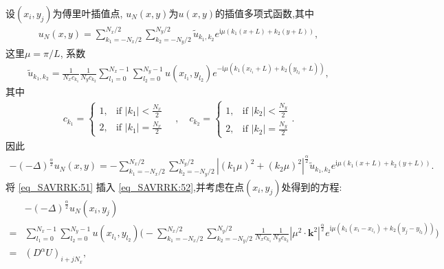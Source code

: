 设$\left(x_{i}, y_{j}\right)$为傅里叶插值点, $u_{N}(x, y)$为$u(x, y)$的插值多项式函数,其中
\begin{align}\label{eq_SAVRRK:50}
u_{N}(x, y)=\sum_{k_{1}=-N_{x} / 2}^{N_{x} / 2} \sum_{k_{2}=-N_{y} / 2}^{N_{y} / 2} \tilde{u}_{k_{1}, k_{2}} e^{\mathrm{i}\mu\left( k_{1} (x+L)+k_{2}(y+L)\right)},
\end{align}
这里$\mu={\pi}/{L}$, 系数
\begin{align}\label{eq_SAVRRK:51}
\tilde{u}_{k_{1}, k_{2}}=\frac{1}{N_{x} c_{k_{1}}} \frac{1}{N_{y} c_{k_{2}}} \sum_{l_1=0}^{N_{x}-1} \sum_{l_2=0}^{N_{y}-1} u(x_{l_1}, y_{l_2}) e^{-\mathrm{i}\mu\left( k_{1}(x_{l_1}+L)+k_{2}(y_{l_2}+L)\right)},
\end{align}
其中
\begin{align}c_{k_1} = \begin{cases} 1, & \text{if } |k_1| < \frac{N_x}{2} \\ 2, & \text{if } |k_1| = \frac{N_x}{2} \end{cases} \quad , \quad c_{k_2} = \begin{cases} 1, & \text{if } |k_2| < \frac{N_y}{2} \\ 2, & \text{if } |k_2| = \frac{N_y}{2} \end{cases}.\end{align}
因此
\begin{align}\label{eq_SAVRRK:52}
-(-\Delta)^{\frac{\alpha}{2}} u_{N}\left(x, y\right)=-\sum\limits_{k_{1}=-N_{x} / 2}^{N_{x} / 2} \sum\limits_{k_{2}=-N_{y} / 2}^{N_{y} / 2}\left|\left(k_{1} \mu\right)^{2}+\left(k_{2} \mu\right)^{2}\right|^{\frac{\alpha}{2}} \tilde{u}_{k_{1}, k_{2}} e^{\mathrm{i}\mu\left( k_{1} (x+L)+k_{2}(y+L)\right)}.
\end{align}
将 \eqref{eq_SAVRRK:51} 插入 \eqref{eq_SAVRRK:52},并考虑在点$(x_i,y_j)$处得到的方程:
\begin{align}
&-(-\Delta)^{\frac{\alpha}{2}} u_{N}\left(x_{i}, y_{j}\right)\nonumber\\
=&\sum\limits_{l_{1}=0}^{N_{x}-1} \sum\limits_{l_{2}=0}^{N_{y}-1}u(x_{l_{1}}, y_{l_{2}})\Big(-\sum\limits_{k_{1}=-N_{x} / 2}^{N_{x} / 2} \sum\limits_{k_{2}=-N_{y} / 2}^{N_{y} / 2} \frac{1}{N_{x} c_{k_{1}}} \frac{1}{N_{y} c_{k_{2}}}\left|\mu^{2} \cdot \mathbf{k}^{2}\right|^{\frac{\alpha}{2}} e^{\mathrm{i} \mu\left(k_{1}\left(x_{i}-x_{l_{1}}\right)+k_{2}\left(y_{j}-y_{l_{2}}\right)\right)}\Big)\nonumber\\
=&\left(D^{\alpha}U\right)_{i+j N_{x}},\label{eq_SAVRRK:53}
\end{align}
